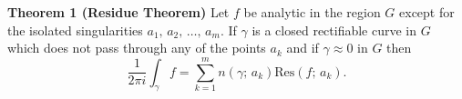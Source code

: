 \documentclass{article}
\begin{document}
	\textbf{Theorem 1 (Residue Theorem)}
	Let $f$ be analytic in the region $G$ except for the isolated
	singularities $a_1,\,a_2,\,\ldots,\,a_m$. If $\gamma$ is a closed
	rectifiable curve in $G$ which does not pass through any of the
	points $a_k$ and if $\gamma\approx 0$ in $G$ then
	\begin{equation*}
		\frac{1}{2\pi i}\int_\gamma f
		=\sum_{k=1}^m n(\gamma;\,a_k) \text{Res}(f;\,a_k).
	\end{equation*}
\end{document}

